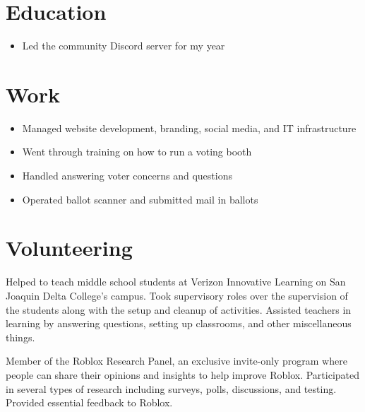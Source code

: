 \documentclass{my_cv}
\begin{document}

\section{Education}

\begin{itemize}
    \item Led the community Discord server for my year
\end{itemize}


\section{Work}

\begin{itemize}
    \item Managed website development, branding, social media, and IT infrastructure
\end{itemize}

\begin{itemize}
    \item Went through training on how to run a voting booth
    \item Handled answering voter concerns and questions
    \item Operated ballot scanner and submitted mail in ballots
\end{itemize}

\section{Volunteering}

Helped to teach middle school students at Verizon Innovative Learning on San Joaquin Delta College's campus. Took supervisory roles over the supervision of the students along with the setup and cleanup of activities. Assisted teachers in learning by answering questions, setting up classrooms, and other miscellaneous things.

Member of the Roblox Research Panel, an exclusive invite-only program where people can share their opinions and insights to help improve Roblox. Participated in several types of research including surveys, polls, discussions, and testing. Provided essential feedback to Roblox.
\end{document}
